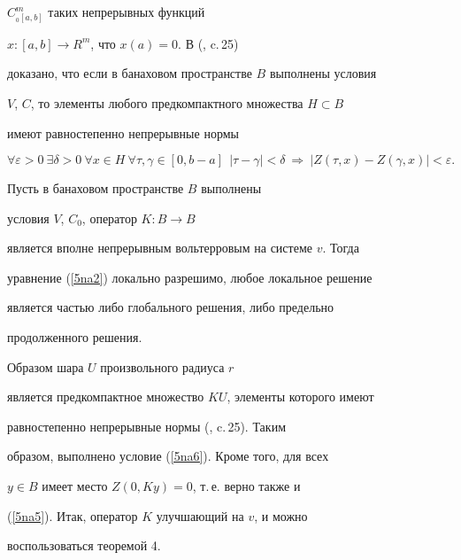 $C_{_{0} [a, b]}^m$ таких непрерывных функций


$x:[a, b]\to R^m$, что $x(a)=0$. В (\cite{Juk300}, c.\,25)


доказано, что если в банаховом пространстве $B$ выполнены условия


$V$, $C$, то элементы любого предкомпактного множества $H\subset B$


имеют равностепенно непрерывные нормы


$$


\forall \varepsilon>0 \ \exists \delta


>0 \ \forall x\in H \ \forall \tau,\gamma


\in[0, b-a]\ \ |\tau-\gamma |<\delta\ \Rightarrow \ | Z(\tau,x)


-Z(\gamma,x) |<\varepsilon.


$$








\begin{cor}


Пусть в банаховом пространстве $B$ выполнены


условия $V$, $C_{0}$, оператор $K:B \to B$


является вполне непрерывным вольтерровым на системе $v$. Тогда


уравнение (\ref{5na2}) локально разрешимо, любое локальное решение


является частью либо глобального решения, либо предельно


продолженного решения.


\end{cor}








\begin{pf}


Образом шара $U$ произвольного радиуса $r$


является предкомпактное множество $K U$, элементы которого имеют


равностепенно непрерывные нормы (\cite{Juk300}, c.\,25). Таким


образом, выполнено условие (\ref{5na6}). Кроме того, для всех


$y\in B$ имеет место $Z(0,K y)=0$, т.\,е. верно также и


(\ref{5na5}). Итак, оператор $K$ улучшающий на $v$, и можно


воспользоваться теоремой 4.


\end{pf}






